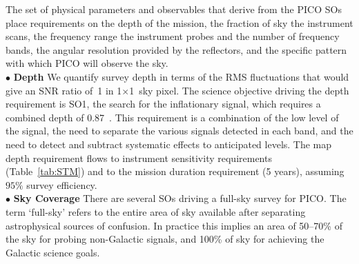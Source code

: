 \documentclass[PICOAPC.tex]{subfiles}
\begin{document}
The set of physical parameters and observables that derive from the PICO \ac{SOs} place 
requirements on the depth of the mission, the fraction of sky the instrument scans, the frequency range the 
instrument probes and the number of frequency bands, the angular resolution provided by the reflectors, and
the specific pattern with which PICO will observe the sky.  \\
%
$\bullet$ {\bf Depth} \hspace{0.1in} We quantify survey depth in terms of the RMS fluctuations that would give
an \ac{SNR} ratio of~1 in 1\arcmin$\times$1\arcmin\ sky pixel.  The science objective driving 
the depth requirement is SO1, the search for the inflationary signal, which 
requires a combined depth of 0.87~\microkamin. This requirement is a combination of the low level of the signal, the need
to separate the various signals detected in each band, and the need to detect and subtract systematic effects 
to anticipated levels.  The map depth requirement flows to instrument sensitivity requirements (Table~\ref{tab:STM}) and to the mission duration requirement (5 years), assuming $95\%$ survey efficiency. \\
%
$\bullet$ {\bf Sky Coverage} \hspace{0.1in} There are several \ac{SOs} driving a full-sky survey for PICO. The term `full-sky' refers to the entire area of sky available after separating astrophysical sources of confusion. In practice this implies an area of 50--70\% of the sky for probing non-Galactic signals, and 100\% of sky for achieving the Galactic science goals. 
\end{document}
